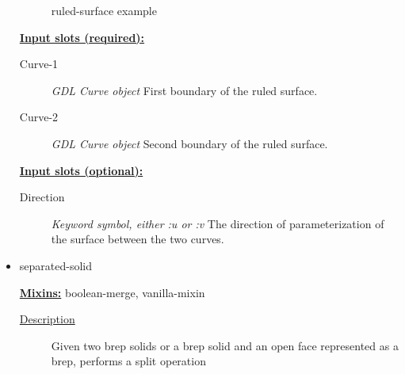 \documentclass [11pt]{book}
\begin{document}
\begin{itemize}
\begin{figure}
\caption{ruled-surface example}

\label{fig:ruled-surface}

\end{figure}





\textbf{
\underline{Input slots (required):}}

\begin{description}

\item [Curve-1]
\emph{GDL Curve object} First boundary of the ruled surface.


\item [Curve-2]
\emph{GDL Curve object} Second boundary of the ruled surface.


\end{description}






\textbf{
\underline{Input slots (optional):}}

\begin{description}

\item [Direction]
\emph{Keyword symbol, either :u or :v} The direction of parameterization of the surface between the two curves.


\end{description}







\item {}separated-solid


\textbf{
\underline{Mixins:}} boolean-merge, vanilla-mixin





\begin{description}

\item [
\underline{Description}]


Given two brep solids or a brep solid and an open face represented as a brep,
performs a split operation



\end{description}









\end{itemize}
\end{document}
